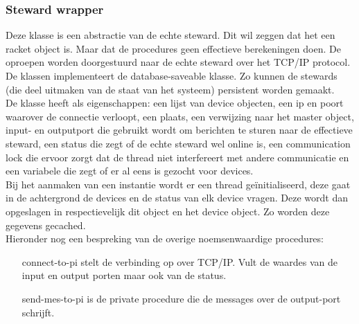 \documentclass{article}
\begin{document}
\subsubsection{Steward wrapper}
\label{ssub:steward}
Deze klasse is een abstractie van de echte steward. Dit wil zeggen dat het een racket object is. Maar dat de procedures geen effectieve berekeningen doen. De oproepen worden doorgestuurd naar de echte steward over het TCP/IP protocol.\\
De klassen implementeert de database-saveable klasse. Zo kunnen de stewards (die deel uitmaken van de staat van het systeem) persistent worden gemaakt. \\
De klasse heeft als eigenschappen: een lijst van device objecten, een ip en poort waarover de connectie verloopt, een plaats, een verwijzing naar het master object, input- en outputport die gebruikt wordt om berichten te sturen naar de effectieve steward, een status die zegt of de echte steward wel online is, een communication lock die ervoor zorgt dat de thread niet interfereert met andere communicatie en een variabele die zegt of er al eens is gezocht voor devices.\\
Bij het aanmaken van een instantie wordt er een thread ge\"initialiseerd, deze gaat in de achtergrond de devices en de status van elk device vragen. Deze wordt dan opgeslagen in respectievelijk dit object en het device object. Zo worden deze gegevens gecached.\\
Hieronder nog een bespreking van de overige noemsenwaardige procedures:
\begin{itemize}
  	\item[connect-to-pi] stelt de verbinding op over TCP/IP. Vult de waardes van de input en output porten maar ook van de status.
  	\item[send-mes-to-pi] is de private procedure die de messages over de output-port schrijft.
\end{itemize}

\end{document}
